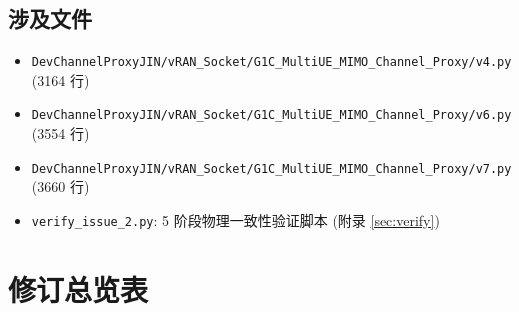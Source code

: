 \documentclass[11pt,a4paper,UTF8,fontset=fandol]{ctexart}
\begin{document}
\subsection{涉及文件}
\begin{itemize}
  \item \texttt{DevChannelProxyJIN/vRAN\_Socket/G1C\_MultiUE\_MIMO\_Channel\_Proxy/v4.py}
        \quad (3164 行)
  \item \texttt{DevChannelProxyJIN/vRAN\_Socket/G1C\_MultiUE\_MIMO\_Channel\_Proxy/v6.py}
        \quad (3554 行)
  \item \texttt{DevChannelProxyJIN/vRAN\_Socket/G1C\_MultiUE\_MIMO\_Channel\_Proxy/v7.py}
        \quad (3660 行)
  \item \texttt{verify\_issue\_2.py}: 5 阶段物理一致性验证脚本 (附录 \ref{sec:verify})
\end{itemize}

\section{修订总览表}
\label{sec:summary}
\end{document}
